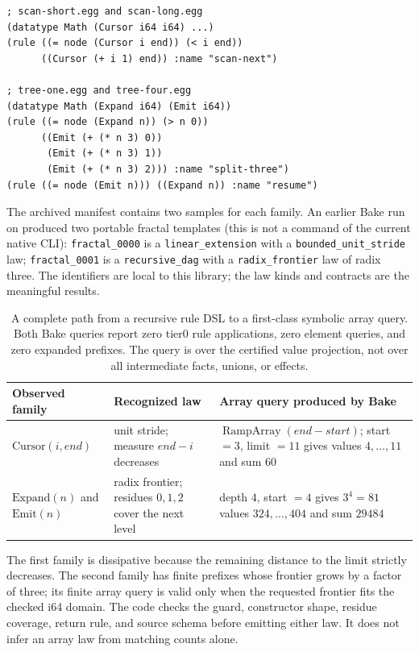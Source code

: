 \documentclass[11pt,a4paper]{article}
\newcommand{\code}[1]{\texttt{#1}}
\begin{document}
\begin{lstlisting}[caption={The two source families supplied to Bake}]
; scan-short.egg and scan-long.egg
(datatype Math (Cursor i64 i64) ...)
(rule ((= node (Cursor i end)) (< i end))
      ((Cursor (+ i 1) end)) :name "scan-next")

; tree-one.egg and tree-four.egg
(datatype Math (Expand i64) (Emit i64))
(rule ((= node (Expand n)) (> n 0))
      ((Emit (+ (* n 3) 0))
       (Emit (+ (* n 3) 1))
       (Emit (+ (* n 3) 2))) :name "split-three")
(rule ((= node (Emit n))) ((Expand n)) :name "resume")
\end{lstlisting}

The archived manifest contains two samples for each family. An earlier Bake run
on  produced two portable fractal
templates (this is not a command of the current native CLI):
\code{fractal\_0000} is a \code{linear\_extension} with a
\code{bounded\_unit\_stride} law; \code{fractal\_0001} is a
\code{recursive\_dag} with a \code{radix\_frontier} law of radix three.
The identifiers are local to this library; the law kinds and contracts are the
meaningful results.

\begin{table}[t]
\centering\small
\begin{tabularx}{\linewidth}{@{}p{.22\linewidth}p{.22\linewidth}X@{}}
\toprule
Observed family & Recognized law & Array query produced by Bake \\
\midrule
$\mathrm{Cursor}(i,end)$ & unit stride; measure $end-i$ decreases &
$\operatorname{RampArray}(end-start)$; start $=3$, limit $=11$ gives values
$4,\ldots,11$ and sum $60$ \\
$\mathrm{Expand}(n)$ and $\mathrm{Emit}(n)$ & radix frontier; residues
$0,1,2$ cover the next level & depth $4$, start $=4$ gives $3^4=81$ values
$324,\ldots,404$ and sum $29484$ \\
\bottomrule
\end{tabularx}
\caption{A complete path from a recursive rule DSL to a first-class symbolic
array query. Both Bake queries report zero tier0 rule applications, zero element
queries, and zero expanded prefixes. The query is over the certified value
projection, not over all intermediate facts, unions, or effects.}
\label{tab:recursive-array-bake}
\end{table}

\MathRecursiveArrays

The first family is dissipative because the remaining distance to the limit
strictly decreases. The second family has finite prefixes whose frontier grows
by a factor of three; its finite array query is valid only when the requested
frontier fits the checked i64 domain. The code checks the guard, constructor
shape, residue coverage, return rule, and source schema before emitting either
law. It does not infer an array law from matching counts alone.
\end{document}
